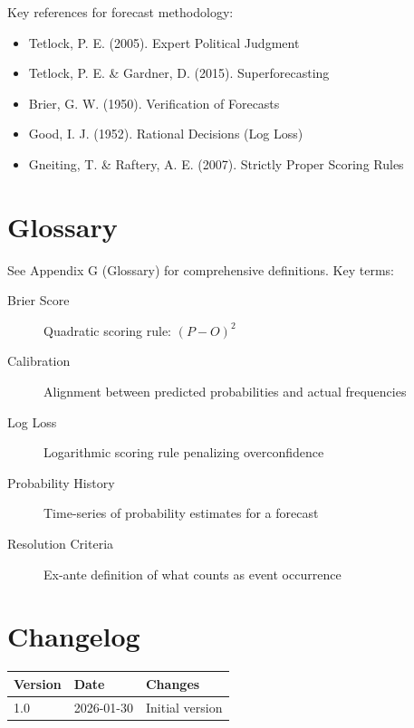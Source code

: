\nocite{bcm_master}

Key references for forecast methodology:
\begin{itemize}
    \item Tetlock, P. E. (2005). Expert Political Judgment
    \item Tetlock, P. E. \& Gardner, D. (2015). Superforecasting
    \item Brier, G. W. (1950). Verification of Forecasts
    \item Good, I. J. (1952). Rational Decisions (Log Loss)
    \item Gneiting, T. \& Raftery, A. E. (2007). Strictly Proper Scoring Rules
\end{itemize}

\section{Glossary}
\label{sec:fct-glossary}

See Appendix G (Glossary) for comprehensive definitions. Key terms:

\begin{description}
    \item[Brier Score] Quadratic scoring rule: $(P - O)^2$
    \item[Calibration] Alignment between predicted probabilities and actual frequencies
    \item[Log Loss] Logarithmic scoring rule penalizing overconfidence
    \item[Probability History] Time-series of probability estimates for a forecast
    \item[Resolution Criteria] Ex-ante definition of what counts as event occurrence
\end{description}

\section*{Changelog}

\begin{tabular}{lll}
\textbf{Version} & \textbf{Date} & \textbf{Changes} \\
\hline
1.0 & 2026-01-30 & Initial version \\
\end{tabular}


